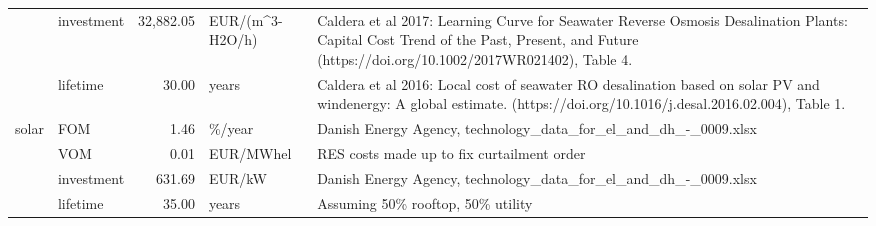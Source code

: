 \begin{longtable}{p{5cm}p{3cm}rp{3cm}p{11cm}}
                      & investment &      32,882.05 &                   EUR/(m\textasciicircum 3-H2O/h) &                                                                                                                                            Caldera et al 2017: Learning Curve for Seawater Reverse Osmosis Desalination Plants: Capital Cost Trend of the Past, Present, and Future (https://doi.org/10.1002/2017WR021402), Table 4. \\
                      & lifetime &          30.00 &                             years &                                                                                                                                                              Caldera et al 2016: Local cost of seawater RO desalination based on solar PV and windenergy: A global estimate. (https://doi.org/10.1016/j.desal.2016.02.004), Table 1. \\
solar & FOM &           1.46 &                            \%/year &                                                                                                                                                                                                                                                                      Danish Energy Agency, technology\_data\_for\_el\_and\_dh\_-\_0009.xlsx \\
                      & VOM &           0.01 &                         EUR/MWhel &                                                                                                                                                                                                                                                                                           RES costs made up to fix curtailment order \\
                      & investment &         631.69 &                            EUR/kW &                                                                                                                                                                                                                                                                      Danish Energy Agency, technology\_data\_for\_el\_and\_dh\_-\_0009.xlsx \\
                      & lifetime &          35.00 &                             years &                                                                                                                                                                                                                                                                                                    Assuming 50\% rooftop, 50\% utility \\

\end{longtable}

